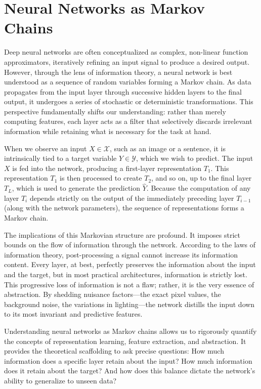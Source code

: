 \chapter{Neural Networks as Markov Chains}

Deep neural networks are often conceptualized as complex, non-linear function approximators, iteratively refining an input signal to produce a desired output. However, through the lens of information theory, a neural network is best understood as a sequence of random variables forming a Markov chain. As data propagates from the input layer through successive hidden layers to the final output, it undergoes a series of stochastic or deterministic transformations. This perspective fundamentally shifts our understanding: rather than merely computing features, each layer acts as a filter that selectively discards irrelevant information while retaining what is necessary for the task at hand.

When we observe an input $X \in \mathcal{X}$, such as an image or a sentence, it is intrinsically tied to a target variable $Y \in \mathcal{Y}$, which we wish to predict. The input $X$ is fed into the network, producing a first-layer representation $T_1$. This representation $T_1$ is then processed to create $T_2$, and so on, up to the final layer $T_L$, which is used to generate the prediction $\hat{Y}$. Because the computation of any layer $T_i$ depends strictly on the output of the immediately preceding layer $T_{i-1}$ (along with the network parameters), the sequence of representations forms a Markov chain.

The implications of this Markovian structure are profound. It imposes strict bounds on the flow of information through the network. According to the laws of information theory, post-processing a signal cannot increase its information content. Every layer, at best, perfectly preserves the information about the input and the target, but in most practical architectures, information is strictly lost. This progressive loss of information is not a flaw; rather, it is the very essence of abstraction. By shedding nuisance factors---the exact pixel values, the background noise, the variations in lighting---the network distills the input down to its most invariant and predictive features. 

Understanding neural networks as Markov chains allows us to rigorously quantify the concepts of representation learning, feature extraction, and abstraction. It provides the theoretical scaffolding to ask precise questions: How much information does a specific layer retain about the input? How much information does it retain about the target? And how does this balance dictate the network's ability to generalize to unseen data?

